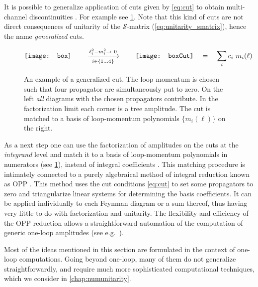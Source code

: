 It is possible to generalize application of cuts given by \cref{eq:cut} to
obtain multi-channel discontinuities \cite{Britto:2004nc}.
For example see \cref{fig:quad_cut}.
Note that this kind of cuts are not direct consequences of unitarity of the $\mathcal{S}$-matrix (\cref{eq:unitarity_smatrix}), hence the name \emph{generalized} cuts.

\begin{figure}[ht]
  \centering
  \begin{equation*}
    \vcenter{\hbox{\texttt{[image: box]}}} \qquad \xrightarrow[i\in\{1\ldots4\}]{\ell_{i}^2-m_i^2\to~0} \qquad
    \vcenter{\hbox{\texttt{[image: boxCut]}}}
    \quad = \quad \sum_{i}  c_{i} ~ m_{i}(\ell) %
  \end{equation*}
  \caption{
    An example of a generalized cut.
    The loop momentum is chosen such that four propagator are simultaneously put to zero.
    On the left \emph{all} diagrams with the chosen propagators contribute.
    In the factorization limit each corner is a tree amplitude.
    The cut is matched to a basis of loop-momentum polynomials $\{m_i(\ell)\}$ on the right.
  }
  \label{fig:quad_cut}
\end{figure}


As a next step one can use the factorization of amplitudes on the cuts at the \emph{integrand} level  and match
it to a basis of loop-momentum polynomials in numerators (see \cref{fig:quad_cut}),
instead of integral coefficients \cite{Giele:2008ve,Ellis:2007br,Ellis:2008ir,Berger:2008sj}.
This matching procedure is intimately connected to a purely algebraical method of integral reduction known as OPP \cite{Ossola:2006us}.
This method uses the cut conditions \cref{eq:cut} to set some propagators to zero and triangularize linear systems for determining the basis coefficients.
It can be applied individually to each Feynman diagram or a sum thereof, thus having very little to do with factorization and unitarity.
The flexibility and efficiency of the OPP reduction allows a straightforward automation of the computation of generic one-loop amplitudes
(see e.g.\ \cite{Berger:2008ag,Berger:2008sj,Cullen:2011ac,Mastrolia:2010nb,Ossola:2007ax}).

Most of the ideas mentioned in this section are formulated in the context of one-loop computations.
Going beyond one-loop, many of them do not generalize straightforwardly, and require much more sophisticated computational techniques,
which we consider in \cref{chap:numunitarity}.
